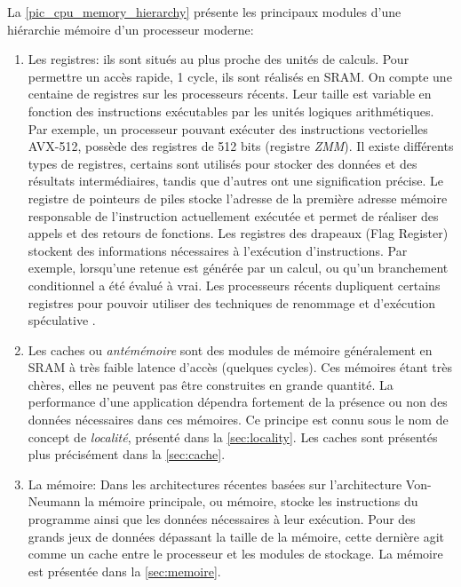 La \autoref{pic_cpu_memory_hierarchy} présente les principaux modules d'une hiérarchie mémoire d'un processeur moderne:
\begin{enumerate}
    
    \item Les registres: ils sont situés au plus proche des unités de calculs. Pour permettre un accès rapide, 1 cycle, ils sont réalisés en SRAM. On compte une centaine de registres sur les processeurs récents. Leur taille est variable en fonction des instructions exécutables par les unités logiques arithmétiques. Par exemple, un processeur pouvant exécuter des instructions vectorielles AVX-512, possède des registres de 512 bits (registre \textit{ZMM}). Il existe différents types de registres, certains sont utilisés pour stocker des données et des résultats intermédiaires, tandis que d'autres ont une signification précise. Le registre de pointeurs de piles stocke l'adresse de la première adresse mémoire responsable de l'instruction actuellement exécutée et permet de réaliser des appels et des retours de fonctions. Les registres des drapeaux (Flag Register) stockent des informations nécessaires à l'exécution d'instructions. Par exemple, lorsqu'une retenue est générée par un calcul, ou qu'un branchement conditionnel a été évalué à vrai. Les processeurs récents dupliquent certains registres pour pouvoir utiliser des techniques de renommage \cite{moudgill1993register} et d'exécution spéculative \cite{chou2004efficient}.

    \item Les caches ou \textit{antémémoire} sont des modules de mémoire généralement en SRAM à très faible latence d'accès (quelques cycles). Ces mémoires étant très chères, elles ne peuvent pas être construites en grande quantité. La performance d'une application dépendra fortement de la présence ou non des données nécessaires dans ces mémoires. Ce principe est connu sous le nom de concept de \textit{localité}, présenté dans la \autoref{sec:locality}. Les caches sont présentés plus précisément dans la \autoref{sec:cache}.
    
    \item La mémoire: Dans les architectures récentes basées sur l'architecture Von-Neumann la mémoire principale, ou mémoire, stocke les instructions du programme ainsi que les données nécessaires à leur exécution. Pour des grands jeux de données dépassant la taille de la mémoire, cette dernière agit comme un cache entre le processeur et les modules de stockage. La mémoire est présentée dans la \autoref{sec:memoire}.
    

\end{enumerate}
